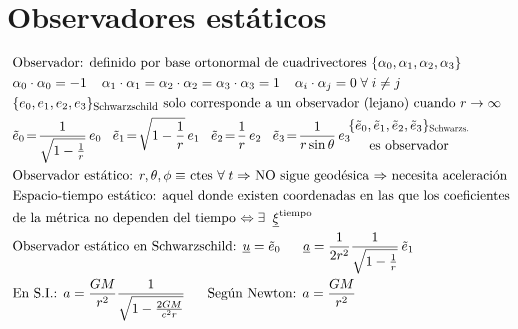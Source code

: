 \section*{Observadores estáticos}
\begin{align*}
    &\text{Observador: definido por base ortonormal  de cuadrivectores } \{\alpha_0, \alpha_1, \alpha_2, \alpha_3\}\\
    &\alpha_0\cdot\alpha_0 =-1 \; \; \;\; \alpha_1\cdot\alpha_1 =\alpha_2\cdot\alpha_2 =\alpha_3\cdot\alpha_3 =1\; \; \; \;\alpha_i\cdot\alpha_j = 0 \; \forall \; i\neq j\\
    &\text{$\{e_0,e_1, e_2,e_3\}_{\scalebox{0.8}{\text{Schwarzschild}}}$ solo corresponde a un observador (lejano) cuando } r\rightarrow \infty\\   \
    &\tilde{e}_0\!=\!\frac{1}{\sqrt{1-\frac{1}{r}}}\,e_0\;\;\; \tilde{e}_1\!=\! \sqrt{1-\frac{1}{r}}\,e_1\;\;\; \tilde{e}_2\! =\! \frac{1}{r} \, e_2 \; \; \; \tilde{e}_3\!=\! \frac{1}{r\sin\theta}\,e_3  \!\!\!\!\!\!\!\!\!\!
    \begin{array}{cc}
         &\{\tilde{e}_0,\tilde{e}_1,\tilde{e}_2,\tilde{e}_3\}_{\scalebox{0.7}{\text{Schwarzs.}}} \vspace{3pt} \\
         & \text{es observador}
    \end{array}
    \\
    &\text{Observador estático: $r, \theta, \phi \equiv $ ctes $\forall \; t \Rightarrow$ NO sigue geodésica $\Rightarrow$ necesita aceleración}\\
    &\text{Espacio-tiempo estático: aquel donde existen coordenadas en las que los coeficientes}\\
    &\text{de la métrica no dependen del tiempo $\Leftrightarrow \exists\; \;  \underline{\xi}^{\text{tiempo}}$}\\
    &\text{Observador estático en Schwarzschild: } \underline{u}=\tilde{e}_0\; \; \; \; \;\; \underline{a}=\frac{1}{2r^2}\frac{1}{\sqrt{1-\frac{1}{r}}}\,\tilde{e}_1 \\
    &\text{En S.I.: } a= \frac{GM}{r^2} \frac{1}{\sqrt{1-\frac{2GM}{c^2r}}} \;\;\;\;\;\; \text{Según Newton: } a=\frac{GM}{r^2}
\end{align*}

